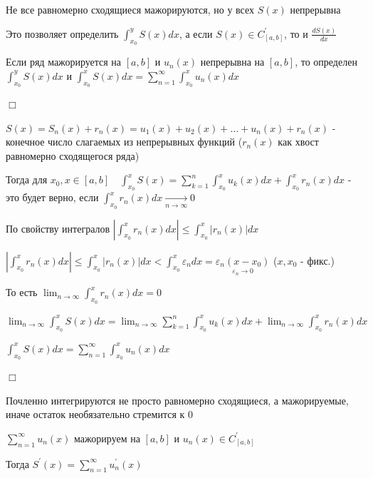 \documentclass[12pt]{article}
\begin{document}
    \Nota Не все равномерно сходящиеся мажорируются, но у всех $S(x)$ непрерывна

    Это позволяет определить $\int_{x_0}^y S(x) dx$, а если $S(x) \in C^\prime_{[a, b]}$, то и $\frac{dS(x)}{dx}$

    \begin{MyTheorem}
        \Ths Если ряд мажорируется на $[a, b]$ и $u_n(x)$ непрерывна на $[a, b]$, то определен $\int_{x_0}^y S(x)dx$ и 
        $\int_{x_0}^x S(x)dx  = \sum_{n = 1}^\infty \int_{x_0}^x u_n(x) dx$
    \end{MyTheorem}

    \begin{MyProof}
        $\Box$

        $S(x) = S_n(x) + r_n(x) = u_1(x) + u_2(x) + \dots + u_n(x) + r_n(x)$ - конечное число слагаемых из непрерывных функций
        ($r_n(x)$ как хвост равномерно сходящегося ряда)

        Тогда для $x_0, x \in [a, b] \quad \int_{x_0}^x S(x) = \sum_{k = 1}^n \int_{x_0}^x u_k(x) dx + \int_{x_0}^x r_n(x) dx$ - это будет
        верно, если $\int_{x_0}^x r_n(x) dx \underset{n \to \infty}{\longrightarrow} 0$

        По свойству интегралов $\left|\int_{x_0}^x r_n(x) dx\right| \leq \int_{x_0}^x |r_n(x)| dx$

        $\left|\int_{x_0}^x r_n(x) dx\right| \leq \int_{x_0}^x |r_n(x)| dx < \int_{x_0}^x \varepsilon_n dx = \underset{\varepsilon_n \to 0}{\varepsilon_n (x - x_0)}$ ($x, x_0$ - фикс.)

        То есть $\lim_{n \to \infty} \int_{x_0}^x r_n(x) dx = 0$

        $\lim_{n \to \infty} \int_{x_0}^x S(x) dx = \lim_{n \to \infty} \sum_{k = 1}^n \int_{x_0}^x u_k(x) dx + \lim_{n \to \infty} \int_{x_0}^x r_n(x) dx$

        $\int_{x_0}^x S(x) dx = \sum_{n = 1}^\infty \int_{x_0}^x u_n(x) dx$

        $\Box$
    \end{MyProof}

    \Nota Почленно интегрируются не просто равномерно сходящиеся, а мажорируемые, иначе остаток необязательно стремится к 0

    \begin{MyTheorem}
        \Ths $\sum_{n = 1}^\infty u_n(x)$ мажорируем на $[a, b]$ и $u_n(x) \in C^\prime_{[a, b]}$

        Тогда $S^\prime(x) = \sum_{n = 1}^\infty u^\prime_n(x)$
    \end{MyTheorem}
\end{document}

